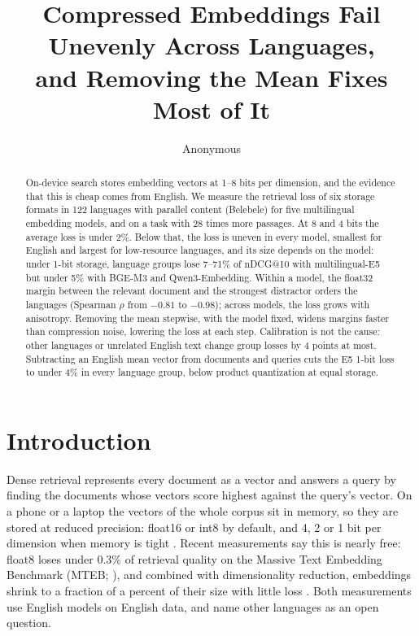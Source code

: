 \documentclass[11pt]{article}
\title{Compressed Embeddings Fail Unevenly Across Languages,\\and Removing the Mean Fixes Most of It}
\author{Anonymous}
\begin{document}
\maketitle

\begin{abstract}
On-device search stores embedding vectors at 1--8 bits per dimension, and the evidence that this is cheap comes from English. We measure the retrieval loss of six storage formats in 122 languages with parallel content (Belebele) for five multilingual embedding models, and on a task with 28 times more passages. At 8 and 4 bits the average loss is under 2\%. Below that, the loss is uneven in every model, smallest for English and largest for low-resource languages, and its size depends on the model: under 1-bit storage, language groups lose 7--71\% of nDCG@10 with multilingual-E5 but under 5\% with BGE-M3 and Qwen3-Embedding. Within a model, the float32 margin between the relevant document and the strongest distractor orders the languages (Spearman $\rho$ from $-0.81$ to $-0.98$); across models, the loss grows with anisotropy. Removing the mean stepwise, with the model fixed, widens margins faster than compression noise, lowering the loss at each step. Calibration is not the cause: other languages or unrelated English text change group losses by 4 points at most. Subtracting an English mean vector from documents and queries cuts the E5 1-bit loss to under 4\% in every language group, below product quantization at equal storage.
\end{abstract}

\section{Introduction}
Dense retrieval represents every document as a vector and answers a query by finding the documents whose vectors score highest against the query's vector. On a phone or a laptop the vectors of the whole corpus sit in memory, so they are stored at reduced precision: float16 or int8 by default, and 4, 2 or 1 bit per dimension when memory is tight \citep{shakir2024quant,yamada2021bpr}. Recent measurements say this is nearly free: float8 loses under 0.3\% of retrieval quality on the Massive Text Embedding Benchmark (MTEB; \citealp{muennighoff2023mteb,sanchez2025storage}), and combined with dimensionality reduction, embeddings shrink to a fraction of a percent of their size with little loss \citep{dimquant2026}. Both measurements use English models on English data, and \citet{dimquant2026} name other languages as an open question.
\end{document}
